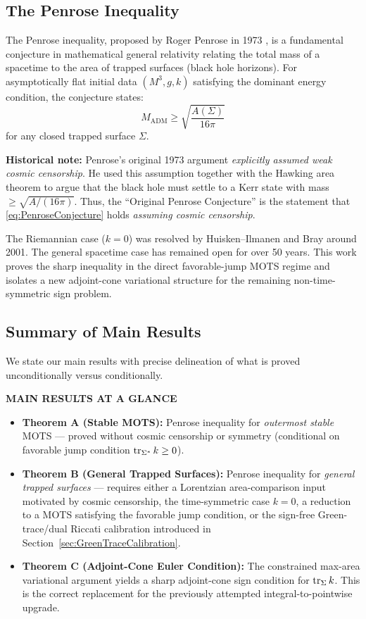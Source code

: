 \subsection{The Penrose Inequality}

The Penrose inequality, proposed by Roger Penrose in 1973 \cite{penrose1973}, is a fundamental conjecture in mathematical general relativity relating the total mass of a spacetime to the area of trapped surfaces (black hole horizons). For asymptotically flat initial data $(M^3, g, k)$ satisfying the dominant energy condition, the conjecture states:
\begin{equation}\label{eq:PenroseConjecture}
    M_{\mathrm{ADM}} \geq \sqrt{\frac{A(\Sigma)}{16\pi}}
\end{equation}
for any closed trapped surface $\Sigma$.

\textbf{Historical note:} Penrose's original 1973 argument \emph{explicitly assumed weak cosmic censorship}. He used this assumption together with the Hawking area theorem to argue that the black hole must settle to a Kerr state with mass $\geq \sqrt{A/(16\pi)}$. Thus, the ``Original Penrose Conjecture'' is the statement that \eqref{eq:PenroseConjecture} holds \emph{assuming cosmic censorship}.

The Riemannian case ($k = 0$) was resolved by Huisken--Ilmanen \cite{huisken2001} and Bray \cite{bray2001} around 2001. The general spacetime case has remained open for over 50 years. This work proves the sharp inequality in the direct favorable-jump MOTS regime and isolates a new adjoint-cone variational structure for the remaining non-time-symmetric sign problem.

\subsection{Summary of Main Results}

We state our main results with precise delineation of what is proved unconditionally versus conditionally.

\begin{framed}
\noindent\textbf{MAIN RESULTS AT A GLANCE}
\begin{itemize}
    \item \textbf{Theorem A (Stable MOTS):} Penrose inequality for \emph{outermost stable} MOTS --- proved without cosmic censorship or symmetry (conditional on favorable jump condition $\operatorname{tr}_{\Sigma^*} k \ge 0$).
    \item \textbf{Theorem B (General Trapped Surfaces):} Penrose inequality for \emph{general trapped surfaces} --- requires either a Lorentzian area-comparison input motivated by cosmic censorship, the time-symmetric case $k=0$, a reduction to a MOTS satisfying the favorable jump condition, or the sign-free Green-trace/dual Riccati calibration introduced in Section~\ref{sec:GreenTraceCalibration}.
    \item \textbf{Theorem C (Adjoint-Cone Euler Condition):} The constrained max-area variational argument yields a sharp adjoint-cone sign condition for $\operatorname{tr}_\Sigma k$. This is the correct replacement for the previously attempted integral-to-pointwise upgrade.
\end{itemize}
\end{framed}

